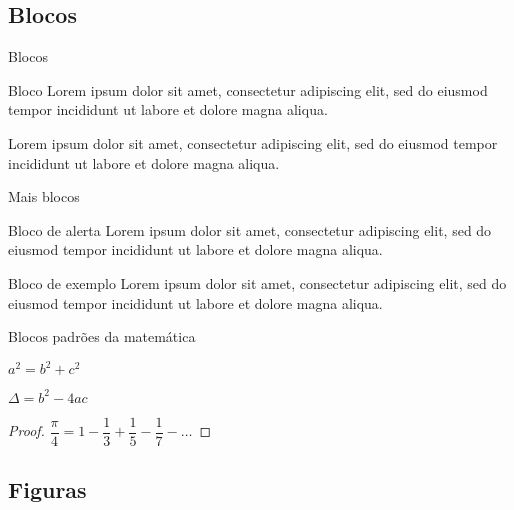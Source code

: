 \documentclass[
brazilian, %
12pt, %
]{beamer}
\begin{document}
	\subsection{Blocos}
	
	\begin{frame}{Blocos}
		\begin{block}{Bloco}
			Lorem ipsum dolor sit amet, consectetur adipiscing elit, sed do eiusmod tempor incididunt ut labore et dolore magna aliqua. 
		\end{block}
		
		\begin{definition}
			Lorem ipsum dolor sit amet, consectetur adipiscing elit, sed do eiusmod tempor incididunt ut labore et dolore magna aliqua.
		\end{definition}
		
	\end{frame}
	
	\begin{frame}{Mais blocos}
		\begin{alertblock}{Bloco de alerta}
			Lorem ipsum dolor sit amet, consectetur adipiscing elit, sed do eiusmod tempor incididunt ut labore et dolore magna aliqua.
		\end{alertblock}
		
		\begin{exampleblock}{Bloco de exemplo}
			Lorem ipsum dolor sit amet, consectetur adipiscing elit, sed do eiusmod tempor incididunt ut labore et dolore magna aliqua.
		\end{exampleblock}
	\end{frame}
	
	\begin{frame}{Blocos padrões da matemática}
		\begin{theorem}
			$ a^2 = b^2 + c^2 $
		\end{theorem}
		
		\begin{corollary}
			$\Delta = b^2 - 4ac$
		\end{corollary}
		
		\begin{proof}
			$\dfrac{\pi}{4} = 1 - \dfrac{1}{3} + \dfrac{1}{5} - \dfrac{1}{7} -\ldots$
		\end{proof}
	\end{frame}
	
	\subsection{Figuras}
	
\end{document}
